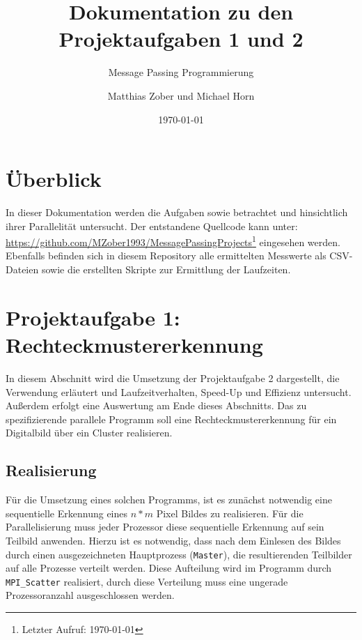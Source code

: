 	
					
\title{Dokumentation zu den Projektaufgaben 1 und 2}
\subtitle{Message Passing Programmierung}

\author{Matthias Zober und Michael Horn\vspace{5cm}}
\date{\today}


\maketitle
\tableofcontents
\thispagestyle{empty}
\pagebreak
\setcounter{page}{1}

\section{Überblick}
In dieser Dokumentation werden die Aufgaben  sowie  betrachtet und hinsichtlich ihrer Parallelität untersucht.
Der entstandene Quellcode kann unter:\\
\url{https://github.com/MZober1993/MessagePassingProjects}\footnote{Letzter Aufruf: \today}
eingesehen werden.\\
Ebenfalls befinden sich in diesem Repository alle ermittelten Messwerte als CSV-Dateien sowie die erstellten Skripte zur Ermittlung der Laufzeiten.

\section{Projektaufgabe 1: Rechteckmustererkennung}
In diesem Abschnitt wird die Umsetzung der Projektaufgabe 2 dargestellt, die Verwendung erläutert und Laufzeitverhalten, Speed-Up und Effizienz untersucht. Außerdem erfolgt eine Auswertung am Ende dieses Abschnitts.
Das zu spezifizierende parallele Programm soll eine Rechteckmustererkennung für ein Digitalbild über ein Cluster realisieren.

\subsection{Realisierung}
\label{ref:realisierungRect}
Für die Umsetzung eines solchen Programms, ist es zunächst notwendig eine sequentielle Erkennung eines $n*m$ Pixel Bildes zu realisieren.
Für die Parallelisierung muss jeder Prozessor diese sequentielle Erkennung auf sein Teilbild anwenden. Hierzu ist es notwendig, dass nach dem Einlesen des Bildes durch 
einen ausgezeichneten Hauptprozess (\texttt{Master}), die resultierenden Teilbilder auf alle Prozesse verteilt werden. Diese Aufteilung wird im Programm durch \texttt{MPI\_Scatter} realisiert, durch diese Verteilung muss eine ungerade Prozessoranzahl ausgeschlossen werden.

